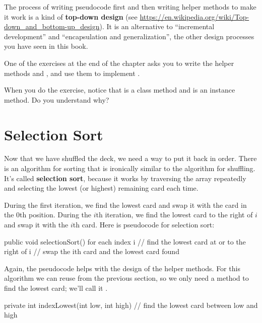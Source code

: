 
The process of writing pseudocode first and then writing helper methods to make it work is a kind of {\bf top-down design} (see \url{https://en.wikipedia.org/wiki/Top-down_and_bottom-up_design}).
It is an alternative to ``incremental development'' and ``encapsulation and generalization'', the other design processes you have seen in this book.

One of the exercises at the end of the chapter asks you to write the helper methods  and , and use them to implement .

When you do the exercise, notice that  is a class method and  is an instance method.
Do you understand why?


\section{Selection Sort}
\label{sorting}


Now that we have shuffled the deck, we need a way to put it back in order.
There is an algorithm for sorting that is ironically similar to the algorithm for shuffling.
It's called {\bf selection sort}, because it works by traversing the array repeatedly and selecting the lowest (or highest) remaining card each time.

During the first iteration, we find the lowest card and swap it with the card in the 0th position.
During the $i$th iteration, we find the lowest card to the right of $i$ and swap it with the $i$th card.
Here is pseudocode for selection sort:

\begin{code}
public void selectionSort() {
    for each index i {
        // find the lowest card at or to the right of i
        // swap the ith card and the lowest card found
    }
}
\end{code}

Again, the pseudocode helps with the design of the helper methods.
For this algorithm we can reuse  from the previous section, so we only need a method to find the lowest card; we'll call it .

\begin{code}
private int indexLowest(int low, int high) {
    // find the lowest card between low and high
}
\end{code}

